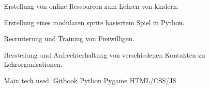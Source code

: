 \documentclass[a4paper]{deedy-resume_twopage} %
\begin{document}
\begin{minipage}[t]{0.66\textwidth}
  \begin{tightitemize}
  \item Erstellung von online Ressourcen zum Lehren von kindern.
  \item Erstellung eines modularen sprite basiertem Spiel in Python.
  \item Recruiterung und Training von Freiwilligen.
  \item Herstellung und Aufrechterhaltung von verschiedenen Kontakten zu Lehrorganisationen.
  \end{tightitemize}
  Main tech used: \textbullet{} Gitbook \textbullet{} Python \textbullet{} Pygame \textbullet{} HTML/CSS/JS

  \sectionspace %



\end{minipage}
\end{document}
